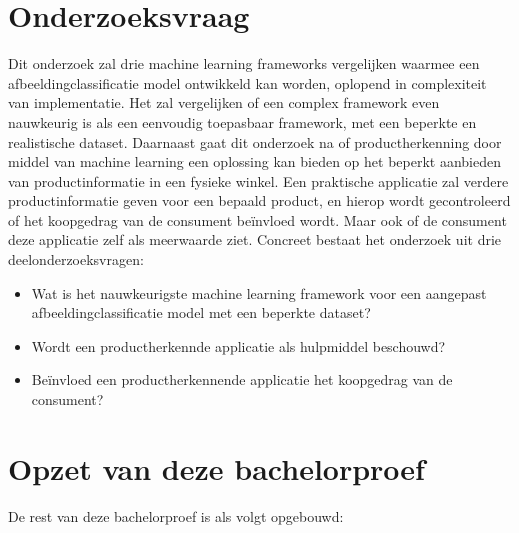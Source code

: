 \section{Onderzoeksvraag}
\label{sec:onderzoeksvraag}

Dit onderzoek zal drie machine learning frameworks vergelijken waarmee een afbeeldingclassificatie model ontwikkeld kan worden, oplopend in complexiteit van implementatie. Het zal vergelijken of een complex framework even nauwkeurig is als een eenvoudig toepasbaar framework, met een beperkte en realistische dataset. Daarnaast gaat dit onderzoek na of productherkenning door middel van machine learning een oplossing kan bieden op het beperkt aanbieden van productinformatie in een fysieke winkel. Een praktische applicatie zal verdere productinformatie geven voor een bepaald product, en hierop wordt gecontroleerd of het koopgedrag van de consument beïnvloed wordt. Maar ook of de consument deze applicatie zelf als meerwaarde ziet. Concreet bestaat het onderzoek uit drie deelonderzoeksvragen:
\begin{itemize}
  \item Wat is het nauwkeurigste machine learning framework voor een aangepast afbeeldingclassificatie model met een beperkte dataset?
  \item Wordt een productherkennde applicatie als hulpmiddel beschouwd?
  \item Beïnvloed een productherkennende applicatie het koopgedrag van de consument?
\end{itemize}


\section{Opzet van deze bachelorproef}
\label{sec:opzet-bachelorproef}


De rest van deze bachelorproef is als volgt opgebouwd:

